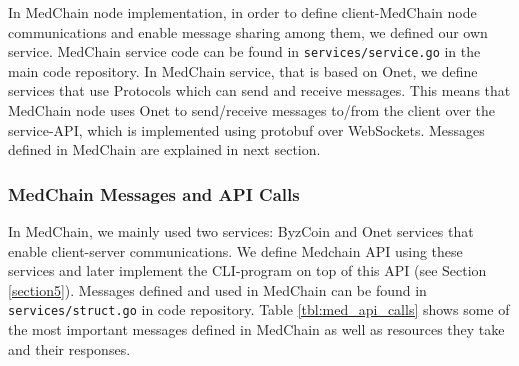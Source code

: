In MedChain node implementation, in order to define client-MedChain node communications and enable message sharing among them, we defined our own service. MedChain service code can be found in \texttt{services/service.go} in the main code repository. In MedChain service, that is based on Onet, we define services that use Protocols which can send and receive messages. This means that MedChain node uses Onet to send/receive messages to/from the client over the service-API, which is implemented using protobuf over WebSockets. Messages defined in MedChain are explained in next section.


\subsubsection{MedChain Messages and API Calls}
In MedChain, we mainly used two services: ByzCoin and Onet services that enable client-server communications. We define Medchain API using these services and later implement the CLI-program on top of this API (see Section \ref{section5}). Messages defined and used in MedChain can be found in \texttt{services/struct.go} in code repository. Table \ref{tbl:med_api_calls} shows some of the most important messages defined in MedChain as well as resources they take and their responses.

